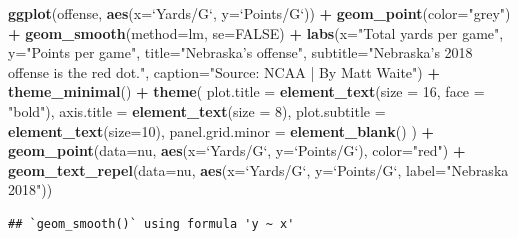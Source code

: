 \documentclass[
]{book}
\newenvironment{Shaded}{\begin{snugshade}}{\end{snugshade}}
\newcommand{\DataTypeTok}[1]{\textcolor[rgb]{0.13,0.29,0.53}{#1}}
\newcommand{\DecValTok}[1]{\textcolor[rgb]{0.00,0.00,0.81}{#1}}
\newcommand{\KeywordTok}[1]{\textcolor[rgb]{0.13,0.29,0.53}{\textbf{#1}}}
\newcommand{\NormalTok}[1]{#1}
\newcommand{\OperatorTok}[1]{\textcolor[rgb]{0.81,0.36,0.00}{\textbf{#1}}}
\newcommand{\OtherTok}[1]{\textcolor[rgb]{0.56,0.35,0.01}{#1}}
\newcommand{\StringTok}[1]{\textcolor[rgb]{0.31,0.60,0.02}{#1}}
\begin{document}
\begin{Shaded}
\begin{Highlighting}[]
\KeywordTok{ggplot}\NormalTok{(offense, }\KeywordTok{aes}\NormalTok{(}\DataTypeTok{x=}\StringTok{`}\DataTypeTok{Yards/G}\StringTok{`}\NormalTok{, }\DataTypeTok{y=}\StringTok{`}\DataTypeTok{Points/G}\StringTok{`}\NormalTok{)) }\OperatorTok{+}\StringTok{ }
\StringTok{  }\KeywordTok{geom_point}\NormalTok{(}\DataTypeTok{color=}\StringTok{"grey"}\NormalTok{) }\OperatorTok{+}\StringTok{ }\KeywordTok{geom_smooth}\NormalTok{(}\DataTypeTok{method=}\NormalTok{lm, }\DataTypeTok{se=}\OtherTok{FALSE}\NormalTok{) }\OperatorTok{+}\StringTok{ }
\StringTok{  }\KeywordTok{labs}\NormalTok{(}\DataTypeTok{x=}\StringTok{"Total yards per game"}\NormalTok{, }\DataTypeTok{y=}\StringTok{"Points per game"}\NormalTok{, }\DataTypeTok{title=}\StringTok{"Nebraska's offense"}\NormalTok{, }\DataTypeTok{subtitle=}\StringTok{"Nebraska's 2018 offense is the red dot."}\NormalTok{, }\DataTypeTok{caption=}\StringTok{"Source: NCAA | By Matt Waite"}\NormalTok{) }\OperatorTok{+}\StringTok{ }
\StringTok{  }\KeywordTok{theme_minimal}\NormalTok{() }\OperatorTok{+}\StringTok{ }
\StringTok{  }\KeywordTok{theme}\NormalTok{(}
    \DataTypeTok{plot.title =} \KeywordTok{element_text}\NormalTok{(}\DataTypeTok{size =} \DecValTok{16}\NormalTok{, }\DataTypeTok{face =} \StringTok{"bold"}\NormalTok{),}
    \DataTypeTok{axis.title =} \KeywordTok{element_text}\NormalTok{(}\DataTypeTok{size =} \DecValTok{8}\NormalTok{), }
    \DataTypeTok{plot.subtitle =} \KeywordTok{element_text}\NormalTok{(}\DataTypeTok{size=}\DecValTok{10}\NormalTok{), }
    \DataTypeTok{panel.grid.minor =} \KeywordTok{element_blank}\NormalTok{()}
\NormalTok{    ) }\OperatorTok{+}
\StringTok{  }\KeywordTok{geom_point}\NormalTok{(}\DataTypeTok{data=}\NormalTok{nu, }\KeywordTok{aes}\NormalTok{(}\DataTypeTok{x=}\StringTok{`}\DataTypeTok{Yards/G}\StringTok{`}\NormalTok{, }\DataTypeTok{y=}\StringTok{`}\DataTypeTok{Points/G}\StringTok{`}\NormalTok{), }\DataTypeTok{color=}\StringTok{"red"}\NormalTok{) }\OperatorTok{+}\StringTok{ }
\StringTok{  }\KeywordTok{geom_text_repel}\NormalTok{(}\DataTypeTok{data=}\NormalTok{nu, }\KeywordTok{aes}\NormalTok{(}\DataTypeTok{x=}\StringTok{`}\DataTypeTok{Yards/G}\StringTok{`}\NormalTok{, }\DataTypeTok{y=}\StringTok{`}\DataTypeTok{Points/G}\StringTok{`}\NormalTok{, }\DataTypeTok{label=}\StringTok{"Nebraska 2018"}\NormalTok{))}
\end{Highlighting}
\end{Shaded}

\begin{verbatim}
## `geom_smooth()` using formula 'y ~ x'
\end{verbatim}
\end{document}

